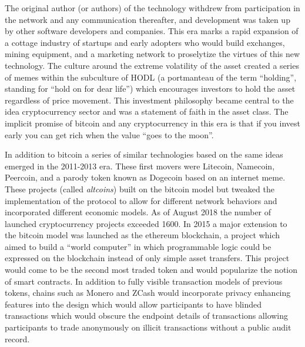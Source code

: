 The original author (or authors) of the technology withdrew from participation
in the network and any communication thereafter, and development was taken up by
other software developers and companies.  This era marks a rapid expansion of a
cottage industry of startups and early adopters who would build exchanges,
mining equipment, and a marketing network to proselytize the virtues of this new
technology. The culture around the extreme volatility of the asset created a
series of memes within the subculture of HODL (a portmanteau of the term
``holding'', standing for ``hold on for dear life'') which encourages investors
to hold the asset regardless of price movement. This investment philosophy
became central to the idea cryptocurrency sector and was a statement of faith in
the asset class.  The implicit promise of bitcoin and any cryptocurrency in this
era is that if you invest early you can get rich when the value ``goes to the
moon''.


In addition to bitcoin a series of similar technologies based on the
same ideas emerged in the 2011-2013 era. These first movers were
Litecoin, Namecoin, Peercoin, and a parody token known as Dogecoin based
on an internet meme. These projects (called \textit{altcoins}) built on the
bitcoin model but tweaked the implementation of the protocol to allow
for different network behaviors and incorporated different economic
models. As of August 2018 the number of launched cryptocurrency projects
exceeded 1600. In 2015 a major extension to the bitcoin model was
launched as the ethereum blockchain, a project which aimed to build a
``world computer'' in which programmable logic could be expressed on the
blockchain instead of only simple asset transfers. This project would
come to be the second most traded token and would popularize the notion
of smart contracts. In addition to fully visible transaction models of
previous tokens, chains such as Monero and ZCash would incorporate
privacy enhancing features into the design which would allow
participants to have blinded transactions which would obscure the
endpoint details of transactions allowing participants to trade
anonymously on illicit transactions without a public audit record.


